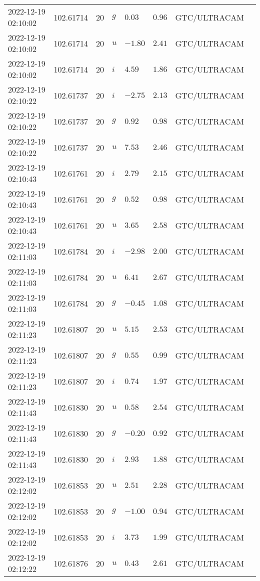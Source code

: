 \documentclass{nature_plusfigure}
\begin{document}
\begin{supplement}
\begin{center}
\begin{longtable}{llllllll}
2022-12-19 02:10:02 & 102.61714 & 20 & $g$ & $0.03$ & $0.96$ & GTC/ULTRACAM &  \\ 
2022-12-19 02:10:02 & 102.61714 & 20 & $u$ & $-1.80$ & $2.41$ & GTC/ULTRACAM &  \\ 
2022-12-19 02:10:02 & 102.61714 & 20 & $i$ & $4.59$ & $1.86$ & GTC/ULTRACAM &  \\ 
2022-12-19 02:10:22 & 102.61737 & 20 & $i$ & $-2.75$ & $2.13$ & GTC/ULTRACAM &  \\ 
2022-12-19 02:10:22 & 102.61737 & 20 & $g$ & $0.92$ & $0.98$ & GTC/ULTRACAM &  \\ 
2022-12-19 02:10:22 & 102.61737 & 20 & $u$ & $7.53$ & $2.46$ & GTC/ULTRACAM &  \\ 
2022-12-19 02:10:43 & 102.61761 & 20 & $i$ & $2.79$ & $2.15$ & GTC/ULTRACAM &  \\ 
2022-12-19 02:10:43 & 102.61761 & 20 & $g$ & $0.52$ & $0.98$ & GTC/ULTRACAM &  \\ 
2022-12-19 02:10:43 & 102.61761 & 20 & $u$ & $3.65$ & $2.58$ & GTC/ULTRACAM &  \\ 
2022-12-19 02:11:03 & 102.61784 & 20 & $i$ & $-2.98$ & $2.00$ & GTC/ULTRACAM &  \\ 
2022-12-19 02:11:03 & 102.61784 & 20 & $u$ & $6.41$ & $2.67$ & GTC/ULTRACAM &  \\ 
2022-12-19 02:11:03 & 102.61784 & 20 & $g$ & $-0.45$ & $1.08$ & GTC/ULTRACAM &  \\ 
2022-12-19 02:11:23 & 102.61807 & 20 & $u$ & $5.15$ & $2.53$ & GTC/ULTRACAM &  \\ 
2022-12-19 02:11:23 & 102.61807 & 20 & $g$ & $0.55$ & $0.99$ & GTC/ULTRACAM &  \\ 
2022-12-19 02:11:23 & 102.61807 & 20 & $i$ & $0.74$ & $1.97$ & GTC/ULTRACAM &  \\ 
2022-12-19 02:11:43 & 102.61830 & 20 & $u$ & $0.58$ & $2.54$ & GTC/ULTRACAM &  \\ 
2022-12-19 02:11:43 & 102.61830 & 20 & $g$ & $-0.20$ & $0.92$ & GTC/ULTRACAM &  \\ 
2022-12-19 02:11:43 & 102.61830 & 20 & $i$ & $2.93$ & $1.88$ & GTC/ULTRACAM &  \\ 
2022-12-19 02:12:02 & 102.61853 & 20 & $u$ & $2.51$ & $2.28$ & GTC/ULTRACAM &  \\ 
2022-12-19 02:12:02 & 102.61853 & 20 & $g$ & $-1.00$ & $0.94$ & GTC/ULTRACAM &  \\ 
2022-12-19 02:12:02 & 102.61853 & 20 & $i$ & $3.73$ & $1.99$ & GTC/ULTRACAM &  \\ 
2022-12-19 02:12:22 & 102.61876 & 20 & $u$ & $0.43$ & $2.61$ & GTC/ULTRACAM &  \\ 

\end{longtable}
\end{center}
\end{supplement}
\end{document}
